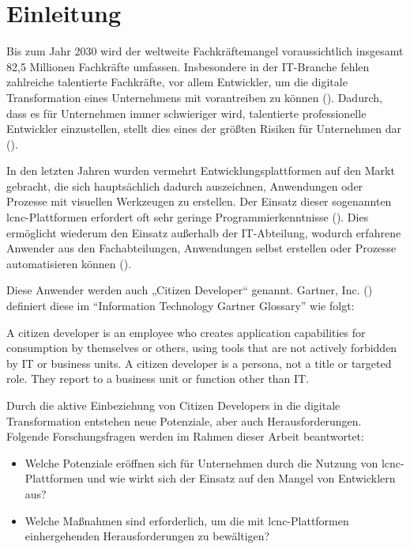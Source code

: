 \section{Einleitung}

Bis zum Jahr 2030 wird der weltweite Fachkräftemangel voraussichtlich insgesamt 82,5 Millionen Fachkräfte umfassen. Insbesondere in der IT-Branche fehlen zahlreiche talentierte Fachkräfte, vor allem Entwickler, um die digitale Transformation eines Unternehmens mit vorantreiben zu können (\cite{grid_dynamics_holdings_inc_software_2022}). Dadurch, dass es für Unternehmen immer schwieriger wird, talentierte professionelle Entwickler einzustellen, stellt dies eines der größten Risiken für Unternehmen dar (\cite{gartner_inc_gartner_2019}).

In den letzten Jahren wurden vermehrt Entwicklungsplattformen auf den Markt gebracht, die sich hauptsächlich dadurch auszeichnen, Anwendungen oder Prozesse mit visuellen Werkzeugen zu erstellen. 
Der Einsatz dieser sogenannten \ac{lcnc}-Plattformen erfordert oft sehr geringe Programmierkenntnisse (\cite[070007-2]{sahinaslan_low-code_2021}). Dies ermöglicht wiederum den Einsatz außerhalb der IT-Abteilung, wodurch erfahrene Anwender aus den Fachabteilungen, Anwendungen selbst erstellen oder Prozesse automatisieren können (\cite[101]{lebens_rise_2021}). 

Diese Anwender werden auch „Citizen Developer“ genannt. Gartner, Inc. (\cite*[][]{gartner_inc_gartner_nodate}) definiert diese im “Information Technology Gartner Glossary” wie folgt:

\begin{adjustwidth}{1.27cm}{0cm}
A citizen developer is an employee who creates application capabilities for consumption by themselves or others, using tools that are not actively forbidden by IT or business units. 
A citizen developer is a persona, not a title or targeted role. They report to a business unit or function other than IT.
\end{adjustwidth}

Durch die aktive Einbeziehung von Citizen Developers in die digitale Transformation entstehen neue Potenziale, aber auch Herausforderungen. 
Folgende Forschungsfragen werden im Rahmen dieser Arbeit beantwortet: 

\begin{itemize}
\item Welche Potenziale eröffnen sich für Unternehmen durch die Nutzung von \ac{lcnc}-Plattformen und wie wirkt sich der Einsatz auf den Mangel von Entwicklern aus? 
\item Welche Maßnahmen sind erforderlich, um die mit \ac{lcnc}-Plattformen einhergehenden Herausforderungen zu bewältigen? 
\end{itemize}

